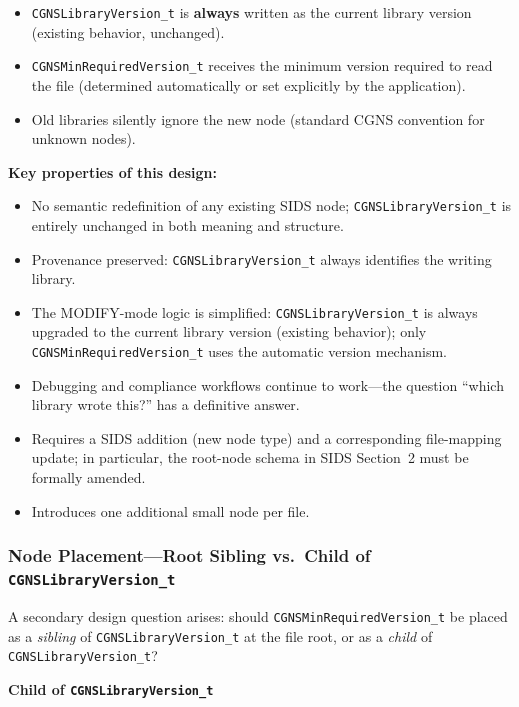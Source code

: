 \documentclass[11pt,letterpaper]{article}
\begin{document}
\begin{itemize}[leftmargin=2em]
\item \texttt{CGNSLibraryVersion\_t} is \textbf{always} written as
  the current library version (existing behavior, unchanged).
\item \texttt{CGNSMinRequiredVersion\_t} receives the minimum
  version required to read the file (determined automatically or set
  explicitly by the application).
\item Old libraries silently ignore the new node (standard CGNS
  convention for unknown nodes).
\end{itemize}

\textbf{Key properties of this design:}
\begin{itemize}[leftmargin=2em]
\item No semantic redefinition of any existing SIDS node;
  \texttt{CGNSLibraryVersion\_t} is entirely unchanged in both
  meaning and structure.
\item Provenance preserved: \texttt{CGNSLibraryVersion\_t} always
  identifies the writing library.
\item The MODIFY-mode logic is simplified:
  \texttt{CGNSLibraryVersion\_t} is always upgraded to the current
  library version (existing behavior); only
  \texttt{CGNSMinRequiredVersion\_t} uses the automatic version
  mechanism.
\item Debugging and compliance workflows continue to work---the
  question ``which library wrote this?'' has a definitive answer.
\item Requires a SIDS addition (new node type) and a corresponding
  file-mapping update; in particular, the root-node schema in
  SIDS Section~2 must be formally amended.
\item Introduces one additional small node per file.
\end{itemize}

\subsubsection{Node Placement---Root Sibling vs.\ Child of \texttt{CGNSLibraryVersion\_t}}
\label{sec:alt-b-placement}

A secondary design question arises: should
\texttt{CGNSMinRequiredVersion\_t} be placed as a \emph{sibling} of
\texttt{CGNSLibraryVersion\_t} at the file root, or as a
\emph{child} of \texttt{CGNSLibraryVersion\_t}?

\textbf{Child of \texttt{CGNSLibraryVersion\_t}}
\end{document}
